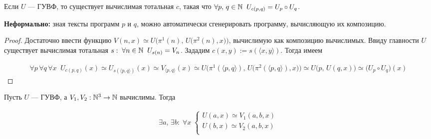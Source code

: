 \documentclass[a4paper, fleqn]{article}
\newcommand{\pair}[1]{\langle#1\rangle}
\begin{document}
        \begin{proposition}
            Если $U$ --- ГУВФ, то существует вычислимая тотальная $c$, такая что $\forall p, \, q \in \mathbb{N} \;\; U_{c(p, q)} = U_p \circ U_q$.
        \end{proposition}

        \textbf{Неформально:} зная тексты программ $p$ и $q$, можно автоматически сгенерировать программу, вычисляющую их композицию.

        \begin{proof}
            Достаточно ввести функцию $V(n, x) \simeq U\bigl(\pi^1(n), \, U\bigl(\pi^2(n), x\bigr)\bigr)$, вычислимую как композицию вычислимых. Ввиду главности $U$ существует вычислимая тотальная $s: \; \forall n \in \mathbb{N} \;\; U_{s(n)} = V_n$. Зададим $c(x, y) := s(\pair{x, y})$. Тогда имеем

            \begin{equation*}
            \begin{gathered}
            \forall p \, \forall q \, \forall x \;\; U_{c(p, q)}(x) \simeq U_{s(\pair{p, q})}(x) \simeq V_{\pair{p, q}}(x) \simeq U\bigl(\pi^1(\pair{p, q}), \, U\bigl(\pi^2(\pair{p, q}), x\bigr)\bigr) \simeq U\bigl(p, \, U(q, x)\bigr) \simeq \bigl(U_p \circ U_q\bigr)(x)
            \end{gathered}
            \end{equation*}
        \end{proof}

        \begin{theorem}
            Пусть $U$ --- ГУВФ, а $V_1, V_2 : \mathbb{N}^3 \to \mathbb{N}$ вычислимы. Тогда

            \begin{equation*}
            \begin{gathered}
            \exists a, \, \exists b : \; \forall x \;
            \begin{cases}
            U(a, x) \simeq V_1(a, b, x) \\
            U(b, x) \simeq V_2(a, b, x) \\
            \end{cases}
            \end{gathered}
            \end{equation*}
        \end{theorem}
\end{document}
